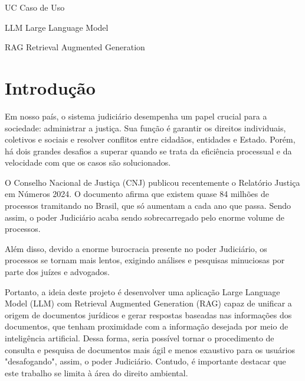 \documentclass[
	12pt,				%
	openright,			%
	oneside,			    %
	a4paper,				%
	english,			%
	french,			%
	spanish,			%
	brazil			%
	]{abntex2}
\begin{document}
\begin{siglas}
  \item[UC] Caso de Uso
  \item [LLM] Large Language Model
  \item [RAG] Retrieval Augmented Generation
\end{siglas}

\tableofcontents*
\cleardoublepage



\textual


\chapter{Introdução}
Em nosso país, o sistema judiciário desempenha um papel crucial para a sociedade: administrar a justiça. Sua função é garantir os direitos individuais, coletivos e sociais e resolver conflitos entre cidadãos, entidades e Estado. Porém, há dois grandes desafios a superar quando se trata da eficiência processual e da velocidade com que os casos são solucionados.

O Conselho Nacional de Justiça (CNJ) publicou recentemente o Relatório Justiça em Números 2024. O documento afirma que existem quase  84 milhões de processos tramitando no Brasil, que só aumentam a cada ano que passa. Sendo assim, o poder Judiciário acaba sendo sobrecarregado pelo enorme volume de processos.

Além disso, devido a enorme burocracia presente no poder Judiciário, os processos se tornam mais lentos, exigindo análises e pesquisas minuciosas por parte dos juízes e advogados.

Portanto, a ideia deste projeto é desenvolver uma aplicação  Large Language Model (LLM) com Retrieval Augmented Generation (RAG) capaz de unificar a origem de documentos jurídicos e gerar respostas baseadas nas informações dos documentos, que tenham proximidade com a informação desejada por meio de inteligência artificial. Dessa forma, seria possível tornar o procedimento de consulta e pesquisa de documentos mais ágil e menos exaustivo para os usuários "desafogando", assim, o poder Judiciário. Contudo, é importante destacar que este trabalho se limita à área do direito ambiental.
\end{document}
